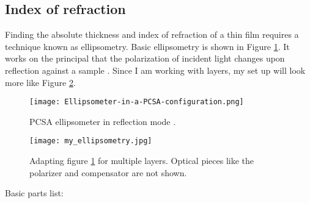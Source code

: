 \documentclass[colorlinks=true,pdfstartview=FitV,linkcolor=blue,
            citecolor=red,urlcolor=magenta]{ligodoc}
\begin{document}
\subsection{Index of refraction}

Finding the absolute thickness and index of refraction of a thin film requires a technique known as ellipsometry. Basic ellipsometry is shown in Figure \ref{fig:PCSAellipsometer}. It works on the principal that the polarization of incident light changes upon reflection against a sample \cite{Ohlidal}. Since I am working with layers, my set up will look more like Figure \ref{fig:myellipsometer}.

\begin{figure}[htbp]
\begin{center}
\texttt{[image: Ellipsometer-in-a-PCSA-configuration.png]}
\caption{PCSA ellipsometer in reflection mode \cite{Kurz}.}
\label{fig:PCSAellipsometer}
\end{center}
\end{figure}

\begin{figure}[htbp]
\begin{center}
\texttt{[image: my\_ellipsometry.jpg]}
\caption{Adapting figure \ref{fig:PCSAellipsometer} for multiple layers. Optical pieces like the polarizer and compensator are not shown.}
\label{fig:myellipsometer}
\end{center}
\end{figure}

\newpage

Basic parts list:
\end{document}

